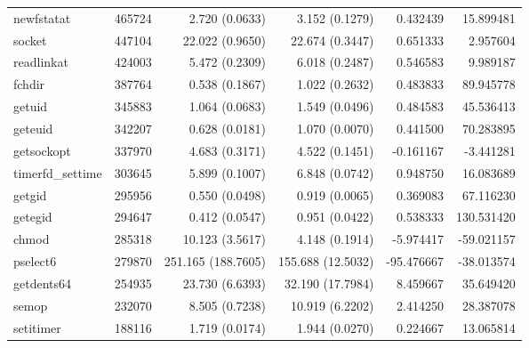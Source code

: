 \begin{longtable}{>{\ttfamily}lrrrrr}
                     newfstatat &     465724 &           2.720 (0.0633) &           3.152 (0.1279) &        0.432439 &    15.899481 \\
                         socket &     447104 &          22.022 (0.9650) &          22.674 (0.3447) &        0.651333 &     2.957604 \\
                     readlinkat &     424003 &           5.472 (0.2309) &           6.018 (0.2487) &        0.546583 &     9.989187 \\
                         fchdir &     387764 &           0.538 (0.1867) &           1.022 (0.2632) &        0.483833 &    89.945778 \\
                         getuid &     345883 &           1.064 (0.0683) &           1.549 (0.0496) &        0.484583 &    45.536413 \\
                        geteuid &     342207 &           0.628 (0.0181) &           1.070 (0.0070) &        0.441500 &    70.283895 \\
                     getsockopt &     337970 &           4.683 (0.3171) &           4.522 (0.1451) &       -0.161167 &    -3.441281 \\
               timerfd\_settime &     303645 &           5.899 (0.1007) &           6.848 (0.0742) &        0.948750 &    16.083689 \\
                         getgid &     295956 &           0.550 (0.0498) &           0.919 (0.0065) &        0.369083 &    67.116230 \\
                        getegid &     294647 &           0.412 (0.0547) &           0.951 (0.0422) &        0.538333 &   130.531420 \\
                          chmod &     285318 &          10.123 (3.5617) &           4.148 (0.1914) &       -5.974417 &   -59.021157 \\
                       pselect6 &     279870 &       251.165 (188.7605) &        155.688 (12.5032) &      -95.476667 &   -38.013574 \\
                     getdents64 &     254935 &          23.730 (6.6393) &         32.190 (17.7984) &        8.459667 &    35.649420 \\
                          semop &     232070 &           8.505 (0.7238) &          10.919 (6.2202) &        2.414250 &    28.387078 \\
                      setitimer &     188116 &           1.719 (0.0174) &           1.944 (0.0270) &        0.224667 &    13.065814 \\

\end{longtable}
